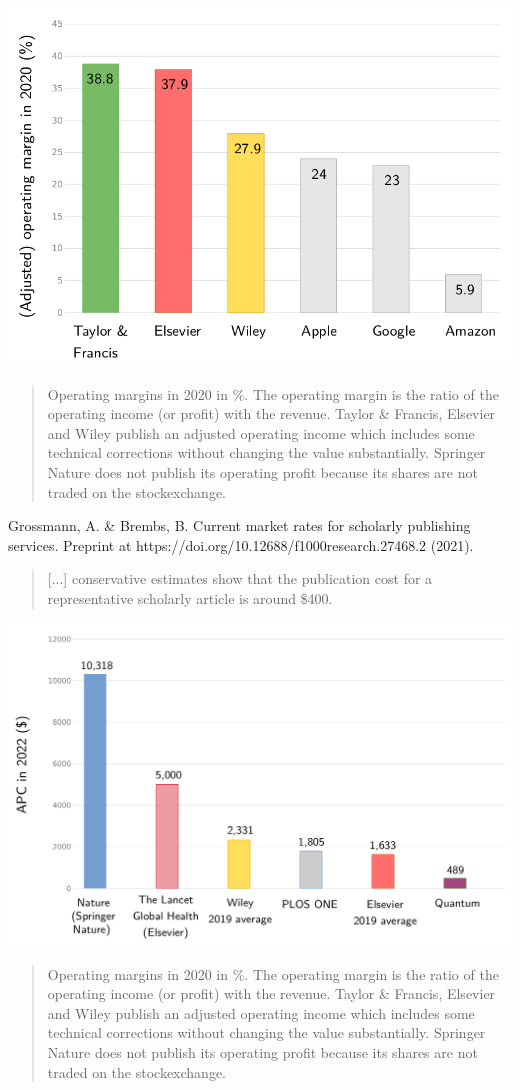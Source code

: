 \documentclass[10pt,compress,serif,aspectratio=169]{beamer}
\begin{document}
\begin{frame}[t]%
 \vskip1cm%
 \includegraphics[width=.6\textwidth]{publisher-margins}
 \begin{quote}
Operating margins in 2020 in \%. The operating margin is the ratio of the operating income (or profit) with the revenue. Taylor \& Francis, Elsevier and Wiley publish an adjusted operating income which includes some technical corrections without changing the value substantially. Springer Nature does not publish its operating profit because its shares are not traded on the stockexchange.  
 \end{quote}
\end{frame}

\begin{frame}[t]%
 \vskip1cm%

Grossmann, A. \& Brembs, B. Current market rates for scholarly publishing services. Preprint at https://doi.org/10.12688/f1000research.27468.2 (2021). 
 \begin{quote}
   [...] conservative estimates show that the publication cost for a representative scholarly article is around \$400.
 \end{quote}

 \pause
 
 \includegraphics[width=.6\textwidth]{publisher-APC}
 \begin{quote}
Operating margins in 2020 in \%. The operating margin is the ratio of the operating income (or profit) with the revenue. Taylor \& Francis, Elsevier and Wiley publish an adjusted operating income which includes some technical corrections without changing the value substantially. Springer Nature does not publish its operating profit because its shares are not traded on the stockexchange.  
 \end{quote}
\end{frame}
\end{document}

